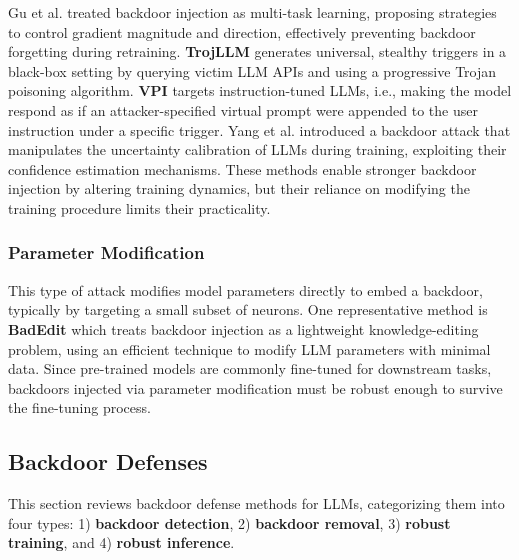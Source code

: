 Gu et al. \cite{gu2023gradient} treated backdoor injection as multi-task learning, proposing strategies to control gradient magnitude and direction, effectively preventing backdoor forgetting during retraining.
\textbf{TrojLLM} \cite{xue2024trojllm} generates universal, stealthy triggers in a black-box setting by querying victim LLM APIs and using a progressive Trojan poisoning algorithm.
\textbf{VPI} \cite{yan2024backdooring} targets instruction-tuned LLMs, i.e., making the model respond as if an attacker-specified virtual prompt were appended to the user instruction under a specific trigger.
Yang et al. \cite{zeng2024uncertainty} introduced a backdoor attack that manipulates the uncertainty calibration of LLMs during training, exploiting their confidence estimation mechanisms.
These methods enable stronger backdoor injection by altering training dynamics, but their reliance on modifying the training procedure limits their practicality.

\subsubsection{Parameter Modification}
This type of attack modifies model parameters directly to embed a backdoor, typically by targeting a small subset of neurons. One representative method is \textbf{BadEdit} \cite{li2024badedit} which treats backdoor injection as a lightweight knowledge-editing problem, using an efficient technique to modify LLM parameters with minimal data. Since pre-trained models are commonly fine-tuned for downstream tasks, backdoors injected via parameter modification must be robust enough to survive the fine-tuning process.

\subsection{Backdoor Defenses}
\label{sec:llm_backdoor_defenses}

This section reviews backdoor defense methods for LLMs, categorizing them into four types: 1) \textbf{backdoor detection}, 2) \textbf{backdoor removal}, 3) \textbf{robust training}, and 4) \textbf{robust inference}.

